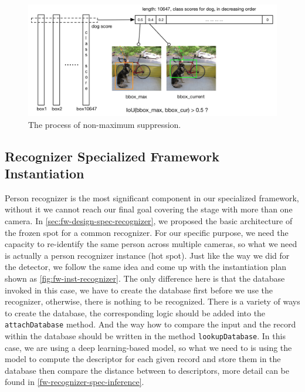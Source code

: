 \begin{figure}
    \includegraphics[width=\linewidth]{figures/framework_detector_nms.png}
    \caption{The process of non-maximum suppression.}
    \label{fig:fw-detector-nms}
\end{figure}

\subsection{Recognizer Specialized Framework Instantiation}
\label{sec:fw-inst-recoginzer}

Person recognizer is the most significant component in our specialized
framework, without it we cannot reach our final goal covering the stage with
more than one camera. In \autoref{sec:fw-design-spec-recognizer}, we proposed the
basic architecture of the frozen spot for a common recognizer. For our specific
purpose, we need the capacity to re-identify the same person across multiple
cameras, so what we need is actually a person recognizer instance (hot spot).
Just like the way we did for the detector, we follow the same idea and come up with
the instantiation plan shown as \autoref{fig:fw-inst-recognizer}. The only
difference here is that the database invoked in this case, we have to create
the database first before we use the recognizer, otherwise, there is nothing to
be recognized. There is a variety of ways to create the database, the corresponding
logic should be added into the \texttt{attachDatabase} method. And the way how
to compare the input and the record within the database should be written in
the method \texttt{lookupDatabase}. In this case, we are using a deep
learning-based model, so what we need to is using the model to compute the
descriptor for each given record and store them in the database then compare the
distance between to descriptors, more detail can be found in
\autoref{fw-recognizer-spec-inference}.

